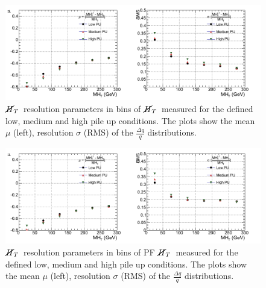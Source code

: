 \begin{figure}[h!]
  \vspace{20pt}
        \centering
        \includegraphics[width=1.0\textwidth]{plots/res_CaloMHT_summary.png}
        \caption{$\cancel{H}_{T}$~resolution parameters in bins of $\cancel{H}_{T}$~measured for the defined low, medium and high pile up conditions. The plots show the mean $\mu$ (left), resolution $\sigma$ (RMS) of the $\frac{\Delta q}{q}$ distributions.}
        \label{fig:calomhtresultspu}
\end{figure}
\begin{figure}[h!]
  \vspace{20pt}
        \centering
        \includegraphics[width=1.0\textwidth]{plots/res_pfMHT_summary.png}
        \caption{$\cancel{H}_{T}$~resolution parameters in bins of PF $\cancel{H}_{T}$~measured for the defined low, medium and high pile up conditions. The plots show the mean $\mu$ (left), resolution $\sigma$ (RMS) of the $\frac{\Delta q}{q}$ distributions.}
        \label{fig:pfmhtresultspu}
\end{figure}







